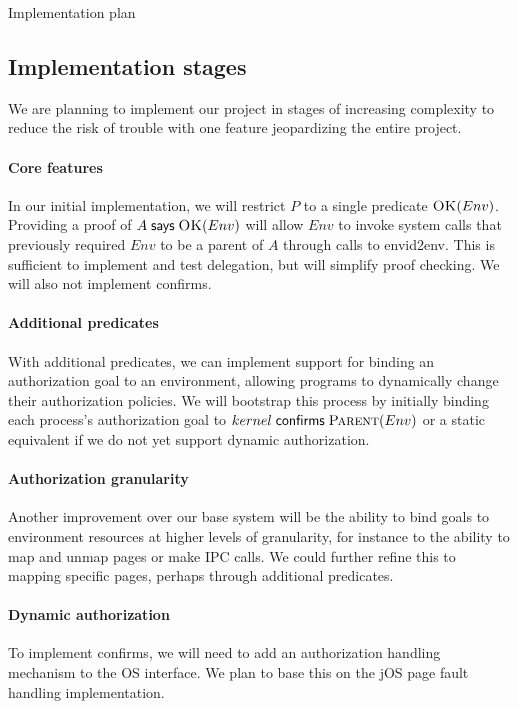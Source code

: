 \documentclass[10pt]{article}
\newcommand{\says}[2]{\ensuremath{#1\;\textsf{says}\;#2}}
\newcommand{\confirms}[2]{\ensuremath{#1\;\textsf{confirms}\;#2}}
\newcommand{\pred}[2]{\ensuremath{\textsc{#1}(#2)}}
\begin{document}
\begin{section}{Implementation plan}

\subsection{Implementation stages}

We are planning to implement our project in stages of increasing complexity to reduce the risk of trouble with one feature jeopardizing the entire project.

\paragraph{Core features}
In our initial implementation, we will restrict $P$ to a single predicate \pred{OK}{Env}.
Providing a proof of \says{A}{\pred{OK}{Env}} will allow $Env$ to invoke system calls that previously
required $Env$ to be a parent of $A$ through calls to \textsf{envid2env}.
This is sufficient to implement and test delegation, but will simplify proof checking.
We will also not implement \textsf{confirms}.

\paragraph{Additional predicates}
With additional predicates, we can implement support for binding an authorization goal to an environment, allowing programs to dynamically change their authorization policies.
We will bootstrap this process by initially binding each process's authorization goal to \confirms{kernel}{\pred{Parent}{Env}} or a static equivalent if we do not yet support dynamic authorization.

\paragraph{Authorization granularity}
Another improvement over our base system will be the ability to bind goals to environment resources at higher levels of granularity, for instance to the ability to map and unmap pages or make IPC calls.
We could further refine this to mapping specific pages, perhaps through additional predicates.

\paragraph{Dynamic authorization}
To implement \textsf{confirms}, we will need to add an authorization handling mechanism to the OS interface.
We plan to base this on the jOS page fault handling implementation.


\end{section}
\end{document}
